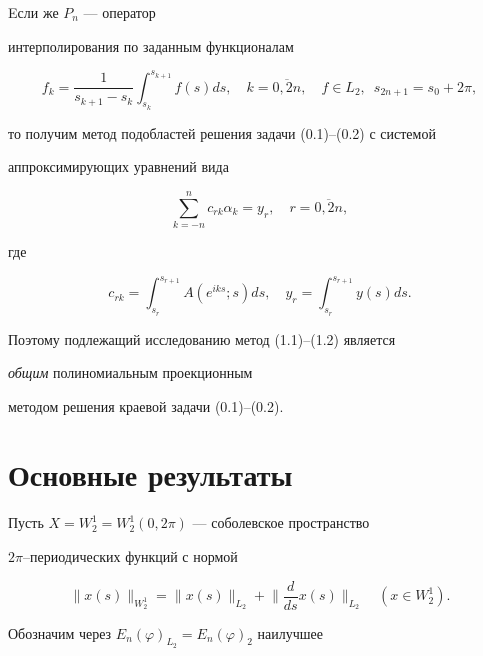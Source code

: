 Eсли же $P_n$ --- оператор


интерполирования по заданным функционалам


\begin{equation}


f_k=\frac{1}{s_{k+1}-s_k}\int_{s_k}^{s_{k+1}}f(s) ds,\quad


k=\overline{0,2n},\quad f\in L_2,\ \; s_{2n+1}=s_0+2\pi,


\end{equation}


то получим метод подобластей решения задачи (0.1)--(0.2) с системой


аппроксимирующих уравнений вида


\begin{equation}


\sum_{k=-n}^nc_{rk} \alpha_k= y_r,\quad r=\overline{0,2n},


\end{equation}


где


$$


c_{rk}=\int_{s_r}^{s_{r+1}}A(e^{iks};s) ds,


\quad y_r=\int_{s_r}^{s_{r+1}}y(s) ds.


$$


Поэтому подлежащий исследованию метод (1.1)--(1.2) является


{\it общим} полиномиальным проекционным


методом решения краевой задачи (0.1)--(0.2).





\section{Основные результаты}





Пусть $X=W_2^1=W_2^1(0,2\pi )$ --- соболевское пространство


$2\pi$--периодических функций с нормой


$$


\|x(s)\|_{W_2^1}=\|x(s)\|_{L_2}+\bigg\| \frac{d}{ds}x(s)\bigg\|_{L_2}


\quad (x\in W_2^1).


$$





Обозначим через $E_n(\varphi )_{L_2}=E_n(\varphi)_2$ наилучшее


